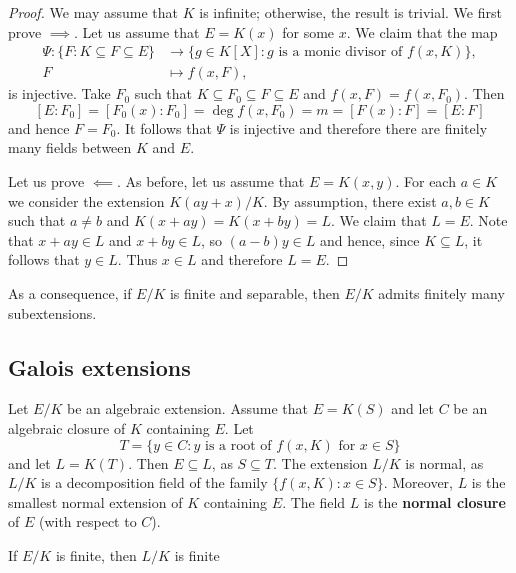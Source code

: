 \begin{proof}
     We may assume that $K$ is infinite; otherwise, the result is trivial. 
    We first prove $\implies$. 
    Let us 
    assume that $E=K(x)$ for some $x$. We claim that the map
    \begin{align*}
    \Psi\colon \{F:K\subseteq F\subseteq E\}&\to\{g\in K[X]:g\text{ is a monic divisor of $f(x,K)$}\},\\
    F&\mapsto f(x,F),
    \end{align*}
    is injective. 
    Take $F_0$ such that $K\subseteq F_0\subseteq F\subseteq E$ and  
    $f(x,F)=f(x,F_0)$. Then  
    \[
    [E:F_0]=[F_0(x):F_0]=\deg f(x,F_0)=m=[F(x):F]=[E:F]
    \]
    and hence $F=F_0$. It follows that $\Psi$ is injective 
    and therefore there are finitely many fields between $K$ and $E$. 
    
    Let us prove $\impliedby$.  
    As before, let us assume that $E=K(x,y)$. For each $a\in K$ we consider
    the extension $K(ay+x)/K$. By assumption, there exist $a,b\in K$ such that
    $a\ne b$ and $K(x+ay)=K(x+by)=L$. We claim that $L=E$. Note that 
    $x+ay\in L$ and $x+by\in L$, so $(a-b)y\in L$ and hence, since $K\subseteq L$, it follows that
    $y\in L$. Thus $x\in L$ and therefore $L=E$. 
\end{proof}

As a consequence, if $E/K$ is finite and separable, then $E/K$ admits
finitely many subextensions. 

\subsection{Galois extensions}

Let $E/K$ be an algebraic extension. Assume that $E=K(S)$ and
let $C$ be an algebraic closure of $K$ containing $E$. Let 
\[
T=\{y\in C:y\text{ is a root of $f(x,K)$ for $x\in S$}\}
\]
and let $L=K(T)$. Then $E\subseteq L$, as $S\subseteq T$. The extension
$L/K$ is normal, as $L/K$ is a decomposition field of the family $\{f(x,K):x\in S\}$. 
Moreover, $L$ is the smallest normal extension of $K$ containing $E$. The field
$L$ is the \textbf{normal closure} of $E$ (with respect to $C$). 

\begin{exercise}
If $E/K$ is finite, then $L/K$ is finite
\end{exercise}

